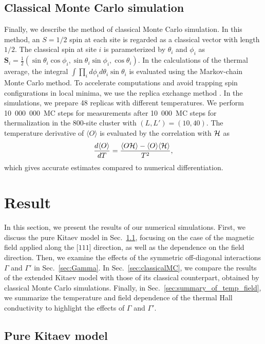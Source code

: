 \documentclass[twocolumn,superscriptaddress,showpacs, longbibliography, aps, prx]{revtex4-2}
\begin{document}
\subsection{Classical Monte Carlo simulation}\label{subsec:Classical Monte Carlo simulation}
Finally, we describe the method of classical Monte Carlo simulation.
In this method, an $S=1/2$ spin at each site is regarded as a classical vector with length $1/2$.
The classical spin at site $i$ is parameterized by $\theta_i$ and $\phi_i$ as $\bm{S}_i = \frac{1}{2}(\sin\theta_i\cos\phi_i, \sin\theta_i\sin\phi_i, \cos\theta_i)$.
In the calculations of the thermal average, the integral $\int \prod_i d\phi_i d\theta_i \sin\theta_i$ is evaluated using the Markov-chain Monte Carlo method.
To accelerate computations and avoid trapping spin configurations in local minima, we use the replica exchange method \cite{Hukushima1996}.
In the simulations, we prepare 48 replicas with different temperatures.
We perform 10~000~000~MC steps for measurements after 10~000~MC steps for thermalization in the 800-site cluster with $(L, L') = (10, 40)$. 
The temperature derivative of $\langle O \rangle$ is evaluated by the correlation with ${\cal H}$ as  
\begin{align}
\frac{d\langle O \rangle}
{dT}=\frac{
\langle O 
{\cal H}\rangle -\langle O 
\rangle \langle {\cal H}\rangle} 
{T^2},  
\end{align}
which gives accurate estimates compared to numerical differentiation. 

\section{Result}\label{sec:Results}
In this section, we present the results of our numerical simulations. First, we discuss the pure Kitaev model in Sec.~\ref{sec:pureKitaev}, focusing on the case of the magnetic field applied along the [$111$] direction, as well as the dependence on the field direction. 
Then, we examine the effects of the symmetric off-diagonal interactions $\Gamma$ and $\Gamma'$ in Sec.~\ref{sec:Gamma}. In Sec.~\ref{sec:classicalMC}, we compare the results of the extended Kitaev model with those of its classical counterpart, obtained by classical Monte Carlo simulations. 
Finally, in Sec.~\ref{sec:summary_of_temp_field}, we summarize the temperature and field dependence of the thermal Hall conductivity to highlight the effects of $\Gamma$ and $\Gamma'$.

\subsection{Pure Kitaev model}
\label{sec:pureKitaev}
\end{document}
